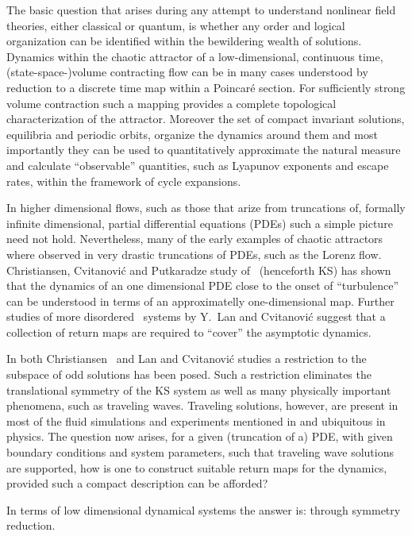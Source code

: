 
The basic question that arises during any attempt to understand
nonlinear field theories, either classical or
quantum, is whether any order and logical organization can be
identified within the bewildering wealth of solutions. Dynamics
within the chaotic attractor of a low-dimensional, continuous
time, (state-space-)volume contracting flow can be in many
cases understood by reduction to a discrete time map within a
Poincar\'e section. For sufficiently strong volume contraction
such a mapping provides a complete topological characterization
of the attractor. Moreover the set of compact
invariant solutions, equilibria and periodic orbits, organize
the dynamics around them and most importantly they can be used
to quantitatively approximate the natural measure and calculate
``observable'' quantities, such as Lyapunov exponents and
escape rates, within the framework of cycle
expansions.

In higher dimensional flows, such as those that arize from truncations of, formally
infinite dimensional, partial differential equations (PDEs) such a simple picture
need not hold. Nevertheless, many of the early examples of chaotic attractors where
observed in very drastic truncations of PDEs, such as the Lorenz flow.
Christiansen, Cvitanovi\'{c} and Putkaradze study of
\KSe\ (henceforth KS) has shown that the dynamics of an one dimensional PDE close to the
onset of ``turbulence'' can be understood in terms of an approximatelly one-dimensional map.
Further studies of more disordered \KS\ systems by Y.~Lan and Cvitanovi\'{c}
suggest that a collection of return maps are required to ``cover'' the asymptotic dynamics.

In both Christiansen \etal\ and Lan and Cvitanovi\'{c} studies a restriction to the
subspace of odd solutions has been posed. Such a restriction eliminates the translational
symmetry of the KS system as well as many physically important phenomena, such as
traveling waves. Traveling solutions, however, are present in most of the fluid
simulations and experiments mentioned in 
and ubiquitous in physics. The question now arises, for a given (truncation of a) PDE, with
given boundary conditions and system parameters, such that
traveling wave solutions are supported, how is one to construct suitable return maps
for the dynamics, provided such a compact description can be afforded?

In terms of low dimensional dynamical systems the answer is: through symmetry reduction.
